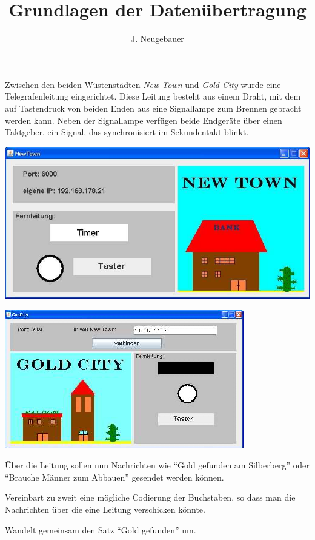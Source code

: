 \documentclass[10pt, a4paper]{scrartcl}
\author{J. Neugebauer}
\title{Grundlagen der Datenübertragung}
\date{\Heute}
\begin{document}
\ReiheTitel

Zwischen den beiden Wüstenstädten \emph{New Town} und \emph{Gold City} wurde eine Telegrafenleitung eingerichtet. Diese Leitung besteht aus einem Draht, mit dem auf Tastendruck von beiden Enden aus eine Signallampe zum Brennen gebracht werden kann. Neben der Signallampe verfügen beide Endgeräte über einen Taktgeber, ein Signal, das synchronisiert im Sekundentakt blinkt.

\begin{multicols}{2}\centering
	\vspace*{2mm}
	\includegraphics[width=.8\columnwidth]{Q2-GK-AB.II.1-Abb_New Town.png}
	
	\includegraphics[width=.8\columnwidth]{Q2-GK-AB.II.1-Abb_Gold City.png}
\end{multicols}

\begin{aufgabe}
	Über die Leitung sollen nun Nachrichten wie \enquote{Gold gefunden am Silberberg} oder \enquote{Brauche Männer zum Abbauen} gesendet werden können.
	
	\begin{teilaufgaben}
		\teilaufgabe Vereinbart zu zweit eine mögliche Codierung der Buchstaben, so dass man die Nachrichten über die eine Leitung verschicken könnte.
		
		\teilaufgabe Wandelt gemeinsam den Satz \enquote{Gold gefunden} um.
	\end{teilaufgaben}
\end{aufgabe}
\end{document}
